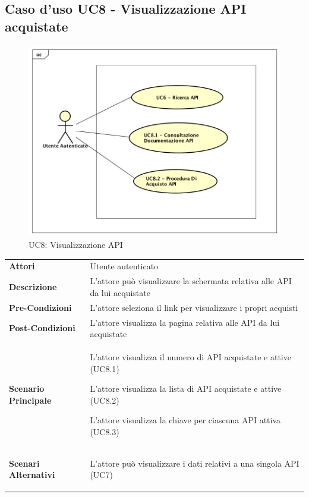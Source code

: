 \newpage
\subsection{Caso d'uso UC8 - Visualizzazione API acquistate}
\label{UC8}
\begin{figure}[ht]
	\centering
	\includegraphics[scale=0.45]{UML/UC8.png}
	\caption{UC8: Visualizzazione API}
\end{figure}

\begin{longtable}{ l | p{11cm}}
	\hline
	\rowcolor{Gray}
	\multicolumn{2}{c}{UC8 - Visualizzazione API acquistate}\\
	\hline
	
	 \textbf{Attori} & Utente autenticato  \\
	\textbf{Descrizione} & L'attore può visualizzare la schermata relativa alle API da lui acquistate \\
	\textbf{Pre-Condizioni} & L'attore seleziona il link per visualizzare i propri acquisti  \\
	\textbf{Post-Condizioni} & L'attore visualizza la pagina relativa alle API da lui acquistate\\
	\textbf{Scenario Principale} & 
	\begin{enumerate*}[label=(\arabic*.),itemjoin={\newline}]
		\item L'attore visualizza il numero di API acquistate e attive (UC8.1)
		\item L'attore visualizza la lista di API acquistate e attive (UC8.2)
		\item L'attore visualizza la chiave per ciascuna API attiva (UC8.3)
	\end{enumerate*}\\
	\textbf{Scenari Alternativi} & 
	\begin{enumerate*}[label=(\arabic*.),itemjoin={\newline}]
		\item L'attore può visualizzare i dati relativi a una singola API (UC7)
	\end{enumerate*}\\
\end{longtable}


